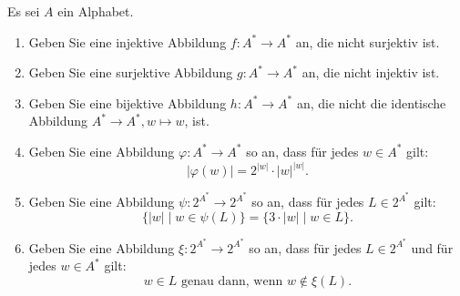 \documentclass[12pt]{article}
\begin{document}
\begin{aufgabe}[1 + 1 + 1 + 1 + 1 + 1 = 6]
  Es sei $A$ ein Alphabet.
  \begin{enumerate}
    \item Geben Sie eine injektive Abbildung $f \colon A^* \to A^*$ an, die
          nicht surjektiv ist.
    \item Geben Sie eine surjektive Abbildung $g \colon A^* \to A^*$ an, die
          nicht injektiv ist.
    \item Geben Sie eine bijektive Abbildung $h \colon A^* \to A^*$ an, die
          nicht die identische Abbildung $A^* \to A^*, w \mapsto w$, ist.
    \item Geben Sie eine Abbildung $\varphi \colon A^* \to A^*$ so an, dass
          für jedes $w \in A^*$ gilt:
          \begin{equation*}
            |\varphi(w)| = 2^{|w|} \cdot |w|^{|w|}.
          \end{equation*}
    \item Geben Sie eine Abbildung $\psi \colon 2^{A^*} \to 2^{A^*}$ so an,
          dass für jedes $L \in 2^{A^*}$ gilt:
          \begin{equation*}
            \{ |w| \mid w \in \psi(L) \} = \{ 3 \cdot |w| \mid w \in L \}.
          \end{equation*}
    \item Geben Sie eine Abbildung $\xi \colon 2^{A^*} \to 2^{A^*}$ so an,
          dass für jedes $L \in 2^{A^*}$ und für jedes $w \in A^*$ gilt:
          \begin{equation*}
            w \in L \text{ genau dann, wenn } w \notin \xi(L).
          \end{equation*}
  \end{enumerate}
\end{aufgabe}
\end{document}
